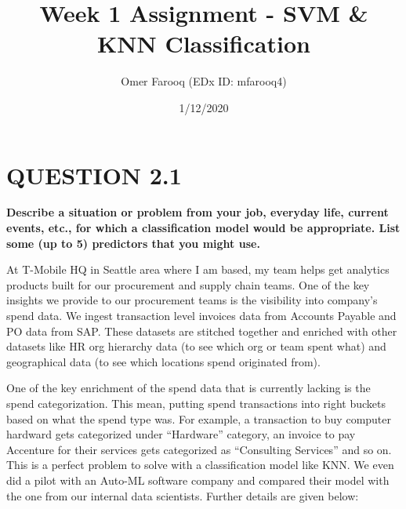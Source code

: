 \documentclass[
]{article}
\title{Week 1 Assignment - SVM \& KNN Classification}
\author{Omer Farooq (EDx ID: mfarooq4)}
\date{1/12/2020}
\begin{document}
\maketitle

\hypertarget{question-2.1}{%
\section{QUESTION 2.1}\label{question-2.1}}

\textbf{Describe a situation or problem from your job, everyday life,
current events, etc., for which a classification model would be
appropriate. List some (up to 5) predictors that you might use.}

At T-Mobile HQ in Seattle area where I am based, my team helps get
analytics products built for our procurement and supply chain teams. One
of the key insights we provide to our procurement teams is the
visibility into company's spend data. We ingest transaction level
invoices data from Accounts Payable and PO data from SAP. These datasets
are stitched together and enriched with other datasets like HR org
hierarchy data (to see which org or team spent what) and geographical
data (to see which locations spend originated from).

One of the key enrichment of the spend data that is currently lacking is
the spend categorization. This mean, putting spend transactions into
right buckets based on what the spend type was. For example, a
transaction to buy computer hardward gets categorized under ``Hardware''
category, an invoice to pay Accenture for their services gets
categorized as ``Consulting Services'' and so on. This is a perfect
problem to solve with a classification model like KNN. We even did a
pilot with an Auto-ML software company and compared their model with the
one from our internal data scientists. Further details are given below:
\end{document}
